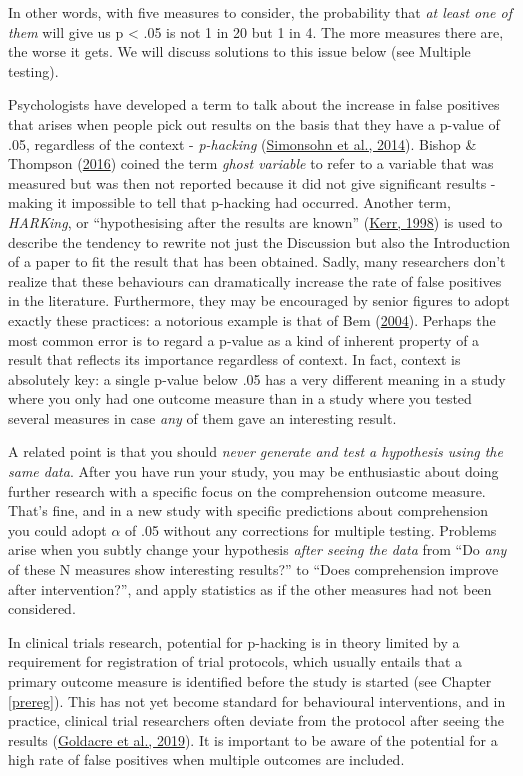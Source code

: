 \documentclass{krantz}
\begin{document}
In other words, with five measures to consider, the probability that \emph{at least one of them} will give us p \textless{} .05 is not 1 in 20 but 1 in 4. The more measures there are, the worse it gets. We will discuss solutions to this issue below (see Multiple testing).

Psychologists have developed a term to talk about the increase in false positives that arises when people pick out results on the basis that they have a p-value of .05, regardless of the context - \emph{p-hacking} (\protect\hyperlink{ref-simonsohn2014a}{Simonsohn et al., 2014}). Bishop \& Thompson (\protect\hyperlink{ref-bishop2016}{2016}) coined the term \emph{ghost variable} to refer to a variable that was measured but was then not reported because it did not give significant results - making it impossible to tell that p-hacking had occurred. Another term, \emph{HARKing}, or ``hypothesising after the results are known'' (\protect\hyperlink{ref-kerr1998}{Kerr, 1998}) is used to describe the tendency to rewrite not just the Discussion but also the Introduction of a paper to fit the result that has been obtained. Sadly, many researchers don't realize that these behaviours can dramatically increase the rate of false positives in the literature. Furthermore, they may be encouraged by senior figures to adopt exactly these practices: a notorious example is that of Bem (\protect\hyperlink{ref-bem2004}{2004}). Perhaps the most common error is to regard a p-value as a kind of inherent property of a result that reflects its importance regardless of context. In fact, context is absolutely key: a single p-value below .05 has a very different meaning in a study where you only had one outcome measure than in a study where you tested several measures in case \emph{any} of them gave an interesting result.

A related point is that you should \emph{never generate and test a hypothesis using the same data}. After you have run your study, you may be enthusiastic about doing further research with a specific focus on the comprehension outcome measure. That's fine, and in a new study with specific predictions about comprehension you could adopt \(\alpha\) of .05 without any corrections for multiple testing. Problems arise when you subtly change your hypothesis \emph{after seeing the data} from ``Do \emph{any} of these N measures show interesting results?'' to ``Does comprehension improve after intervention?'', and apply statistics as if the other measures had not been considered.

In clinical trials research, potential for p-hacking is in theory limited by a requirement for registration of trial protocols, which usually entails that a primary outcome measure is identified before the study is started (see Chapter \ref{prereg}). This has not yet become standard for behavioural interventions, and in practice, clinical trial researchers often deviate from the protocol after seeing the results (\protect\hyperlink{ref-goldacre2019}{Goldacre et al., 2019}). It is important to be aware of the potential for a high rate of false positives when multiple outcomes are included.
\end{document}
